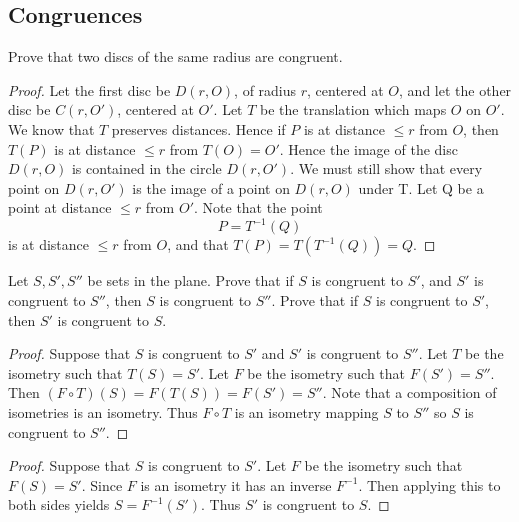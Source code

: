 \subsection{Congruences}

\newpage
\begin{tcolorbox}[title=Problem 1, breakable]
    Prove that two discs of the same radius are congruent.
\end{tcolorbox}

\begin{proof}
    Let the first disc be $D(r, O)$, of radius $r$, centered at $O$, and let
    the other disc be $C(r, O')$, centered at $O'$. Let $T$ be the translation which
    maps $O$ on $O'$. We know that $T$ preserves distances. Hence if $P$ is at distance
    $\le r$ from $O$, then $T(P)$ is at distance $\le r$ from $T(O) = O'$. Hence the image of the
    disc $D(r, O)$ is contained in the circle $D(r, O')$. We must still show that every
    point on $D(r, O')$ is the image of a point on $D(r, O)$ under T. Let Q be a point
    at distance $\le r$ from $O'$. Note that the point
    \[P = T^{-1}(Q)\]
    is at distance $\le r$ from $O$, and that $T(P) = T(T^{-1}(Q)) = Q$.
\end{proof}

\begin{tcolorbox}[title=Problem 2, breakable]
    Let $S, S', S''$ be sets in the plane.
    Prove that if $S$ is congruent to $S'$,
        and $S'$ is congruent to $S''$,
        then $S$ is congruent to $S''$.
    Prove that if $S$ is congruent to $S'$,
        then $S'$ is congruent to $S$.
\end{tcolorbox}

\begin{proof}
    Suppose that $S$ is congruent to $S'$ and $S'$ is congruent to $S''$.
    Let $T$ be the isometry such that $T(S) = S'$.
    Let $F$ be the isometry such that $F(S') = S''$.
    Then $(F \circ T)(S) = F(T(S)) = F(S') = S''$.
    Note that a composition of isometries is an isometry.
    Thus $F \circ T$ is an isometry mapping $S$ to $S''$ 
        so $S$ is congruent to $S''$.
\end{proof}

\begin{proof}
    Suppose that $S$ is congruent to $S'$.
    Let $F$ be the isometry such that $F(S) = S'$.
    Since $F$ is an isometry it has an inverse $F^{-1}$.
    Then applying this to both sides yields $S = F^{-1}(S')$.
    Thus $S'$ is congruent to $S$.
\end{proof}

